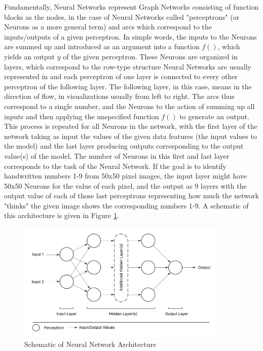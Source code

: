 Fundamentally, Neural Networks represent Graph Networks consisting of function blocks as the nodes, in the case of Neural Networks called "perceptrons" (or Neurons as a more general term) and arcs which correspond to the inputs/outputs of a given perceptron. In simple words, the inputs to the Neurons are summed up and introduced as an argument into a function $f()$, which yields an output $y$ of the given perceptron. These Neurons are organized in layers, which correspond to the row-type structure Neural Networks are usually represented in and each perceptron of one layer is connected to every other perceptron of the following layer. The following layer, in this case, means in the direction of flow, in visualizations usually from left to right. The arcs thus correspond to a single number, and the Neurons to the action of summing up all inputs and then applying the unspecified function $f()$ to generate an output. This process is repeated for all Neurons in the network, with the first layer of the network taking as input the values of the given data features (the input values to the model) and the last layer producing outputs corresponding to the output value(s) of the model. The number of Neurons in this first and last layer corresponds to the task of the Neural Network. If the goal is to identify handwritten numbers 1-9 from 50x50 pixel images, the input layer might have 50x50 Neurons for the value of each pixel, and the output as 9 layers with the output value of each of those last perceptrons representing how much the network "thinks" the given image shows the corresponding numbers 1-9. A schematic of this architecture is given in Figure \ref{fig:neural_network_architecture}.

\begin{figure}[h] 
\centering
\includegraphics[width=0.9\textwidth]{../figures/modelling/neural_network_concept.png} %
\caption{Schematic of Neural Network Architecture}
\label{fig:neural_network_architecture}
\end{figure}


